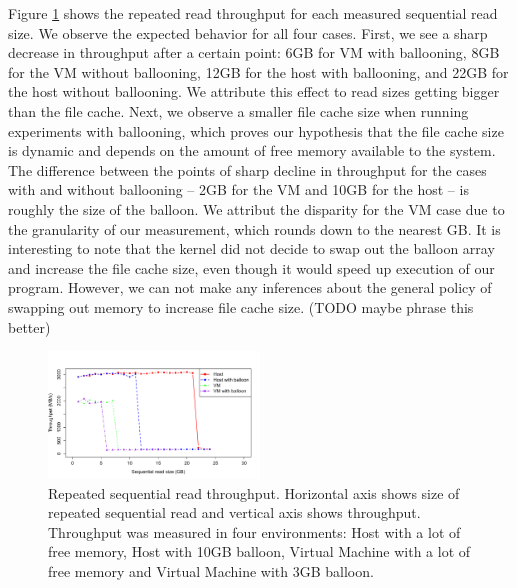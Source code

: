 Figure \ref{fig:p3graph} shows the repeated read throughput for each measured sequential read size. We observe the expected behavior for all four cases. First, we see a sharp decrease in throughput after a certain point: 6GB for VM with ballooning, 8GB for the VM without ballooning, 12GB for the host with ballooning, and 22GB for the host without ballooning. We attribute this effect to read sizes getting bigger than the file cache. Next, we observe a smaller file cache size when running experiments with ballooning, which proves our hypothesis that the file cache size is dynamic and depends on the amount of free memory available to the system. The difference between the points of sharp decline in throughput for the cases with and without ballooning -- 2GB for the VM and 10GB for the host -- is roughly the size of the balloon. We attribut the disparity for the VM case due to the granularity of our measurement, which rounds down to the nearest GB. It is interesting to note that the kernel did not decide to swap out the balloon array and increase the file cache size, even though it would speed up execution of our program. However, we can not make any inferences about the general policy of swapping out memory to increase file cache size. (TODO maybe phrase this better)

\begin{figure}[ht!]
	\includegraphics[width=0.5\textwidth]{./figures/p3.pdf}
	\caption{Repeated sequential read throughput. Horizontal axis shows size of repeated sequential read and vertical axis shows throughput. Throughput was measured in four environments: Host with a lot of free memory, Host with 10GB balloon, Virtual Machine with a lot of free memory and Virtual Machine with 3GB balloon.}
	\label{fig:p3graph}
\end{figure}
